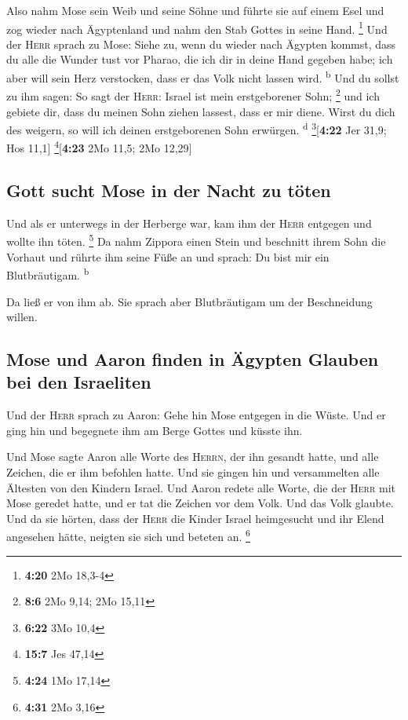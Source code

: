  Also nahm Mose sein Weib und seine Söhne und führte sie
auf einem Esel und zog wieder nach Ägyptenland und nahm den Stab Gottes
in seine Hand. \footnote{\textbf{4:20} 2Mo 18,3-4}  Und
der \textsc{Herr} sprach zu Mose: Siehe zu, wenn du wieder nach Ägypten
kommst, dass du alle die Wunder tust vor Pharao, die ich dir in deine
Hand gegeben habe; ich aber will sein Herz verstocken, dass er das Volk
nicht lassen wird. \textsuperscript{b}  Und du sollst zu
ihm sagen: So sagt der \textsc{Herr}: Israel ist mein erstgeborener
Sohn; \footnote{\textbf{8:6} 2Mo 9,14; 2Mo 15,11}  und
ich gebiete dir, dass du meinen Sohn ziehen lassest, dass er mir diene.
Wirst du dich des weigern, so will ich deinen erstgeborenen Sohn
erwürgen. \textsuperscript{d} \footnote{\textbf{6:22} 3Mo 10,4}{[}\textbf{4:22}
Jer 31,9; Hos 11,1{]} \footnote{\textbf{15:7} Jes 47,14}{[}\textbf{4:23}
2Mo 11,5; 2Mo 12,29{]}

\hypertarget{gott-sucht-mose-in-der-nacht-zu-tuxf6ten}{%
\subsection{Gott sucht Mose in der Nacht zu
töten}\label{gott-sucht-mose-in-der-nacht-zu-tuxf6ten}}

 Und als er unterwegs in der Herberge war, kam ihm der
\textsc{Herr} entgegen und wollte ihn töten. \footnote{\textbf{4:24} 1Mo
  17,14}  Da nahm Zippora einen Stein und beschnitt ihrem
Sohn die Vorhaut und rührte ihm seine Füße an und sprach: Du bist mir
ein Blutbräutigam. \textsuperscript{b}

 Da ließ er von ihm ab. Sie sprach aber Blutbräutigam um
der Beschneidung willen.

\hypertarget{mose-und-aaron-finden-in-uxe4gypten-glauben-bei-den-israeliten}{%
\subsection{Mose und Aaron finden in Ägypten Glauben bei den
Israeliten}\label{mose-und-aaron-finden-in-uxe4gypten-glauben-bei-den-israeliten}}

 Und der \textsc{Herr} sprach zu Aaron: Gehe hin Mose
entgegen in die Wüste. Und er ging hin und begegnete ihm am Berge Gottes
und küsste ihn.

 Und Mose sagte Aaron alle Worte des \textsc{Herrn}, der
ihn gesandt hatte, und alle Zeichen, die er ihm befohlen hatte.
 Und sie gingen hin und versammelten alle Ältesten von
den Kindern Israel.  Und Aaron redete alle Worte, die der
\textsc{Herr} mit Mose geredet hatte, und er tat die Zeichen vor dem
Volk.  Und das Volk glaubte. Und da sie hörten, dass der
\textsc{Herr} die Kinder Israel heimgesucht und ihr Elend angesehen
hätte, neigten sie sich und beteten an. \footnote{\textbf{4:31} 2Mo 3,16}

